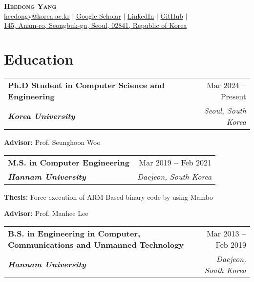 \documentclass[letterpaper,11pt]{article}
\makeatletter
\newcommand{\resumeEducationHeading}[4]{
  \vspace{-2pt}\item
    \begin{tabular*}{0.97\textwidth}[t]{l@{\extracolsep{\fill}}r}
      \textbf{#1} & #2 \\
      \textit{\textbf{\small#3}} & \textit{\small #4} \\
    \end{tabular*}\vspace{-5pt}
}
\newcommand{\resumeSubHeadingListStart}{\begin{itemize}[leftmargin=0.2in]}
\newcommand{\resumeSubHeadingListEnd}{\end{itemize}}
\newcommand{\resumeSubHeadingItemListStart}{\begin{itemize}[label=-, leftmargin=0.15in]}
\newcommand{\resumeSubHeadingItemListEnd}{\end{itemize}\vspace{-5pt}}
\makeatother
\begin{document}

\begin{center}
    \textbf{\Huge \scshape Heedong Yang} \\ \vspace{7pt}
    \small
    \faEnvelope \hspace{.5pt} \href{mailto:heedongy@korea.ac.kr}{heedongy@korea.ac.kr}
    $|$
    \faGraduationCap \hspace{.5pt} \href{https://scholar.google.co.kr/citations?user=Gqegeu0AAAAJ}{Google Scholar}
    $|$
    \faLinkedinSquare \hspace{.5pt} \href{https://www.linkedin.com/in/heedongy}{LinkedIn}
    $|$
    \faGithub \hspace{.5pt} \href{https://github.com/heedongy}{GitHub}
    $|$ \\
    \faMapMarker \hspace{.5pt} \href{https://www.google.com/maps/place/고려대학교+우정정보관/data=!3m1!4b1!4m6!3m5!1s0x357cbcbaa67c853d:0x66a4f0cf5e431e8e!8m2!3d37.5851349!4d127.0284268!16s%2Fg%2F11hdc4yk8b?entry=ttu}{145, Anam-ro, Seongbuk-gu, Seoul, 02841, Republic of Korea}
\end{center}




\section{Education}
  \vspace{3pt}
  \resumeSubHeadingListStart
  \resumeEducationHeading
     {Ph.D Student in Computer Science and Engineering}  
     {Mar 2024 \textbf{--} Present}
     {Korea University}{Seoul, South Korea}
        \resumeSubHeadingItemListStart
        \small{\item{\textbf{Advisor:} Prof. Seunghoon Woo}}
        \resumeSubHeadingItemListEnd
   \resumeEducationHeading
     {M.S. in Computer Engineering}   %
     {Mar 2019 \textbf{--} Feb 2021}
     {Hannam University}{Daejeon, South Korea}
        \resumeSubHeadingItemListStart
        \small{\item{\textbf{Thesis:} Force execution of ARM-Based binary code by using Mambo}
        \item{\textbf{Advisor:} Prof. Manhee Lee}}
        \resumeSubHeadingItemListEnd
    \resumeEducationHeading
      {B.S. \small{in Engineering in Computer, Communications and Unmanned Technology}}
      {Mar 2013 \textbf{--} Feb 2019}
      {Hannam University}{Daejeon, South Korea}
  \resumeSubHeadingListEnd
\end{document}
